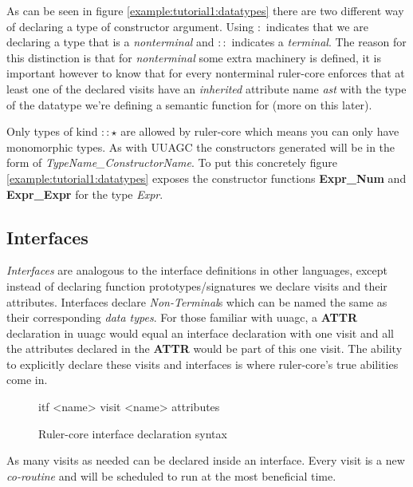 As can be seen in figure \ref{example:tutorial1:datatypes} there are two different way of declaring a type of constructor argument. Using $:$ indicates that we are declaring a type that is a \emph{nonterminal} and $::$ indicates a \emph{terminal}. The reason for this distinction is that for \emph{nonterminal} some extra machinery is defined, it is important however to know that for every nonterminal ruler-core enforces that at least one of the declared visits have an \emph{inherited} attribute name \emph{ast} with the type of the datatype we're defining a semantic function for (more on this later).

Only types of kind $:: \star$ are allowed by ruler-core which means you can only have monomorphic types. As with UUAGC the constructors generated will be in the form of \emph{TypeName\_ConstructorName}. To put this concretely figure \ref{example:tutorial1:datatypes} exposes the constructor functions \textbf{Expr\_Num} and \textbf{Expr\_Expr} for the type \emph{Expr}.

\subsection{Interfaces}
\emph{Interfaces} are analogous to the interface definitions in other languages, except instead of declaring function prototypes/signatures we declare visits and their attributes. Interfaces declare \emph{Non-Terminal}s which can be named the same as their corresponding \emph{data types}. For those familiar with uuagc, a \textbf{ATTR} declaration in uuagc would equal an interface declaration with one visit and all the attributes declared in the \textbf{ATTR} would be part of this one visit. The ability to explicitly declare these visits and interfaces is where ruler-core's true abilities come in.

\begin{figure}[h!]
\begin{code}
itf <name>
  {visit <name>
    {attributes}
  }
\end{code}
\caption{Ruler-core interface declaration syntax}
\label{itf:syntax}
\end{figure}

As many visits as needed can be declared inside an interface. Every visit is a new \emph{co-routine} and will be scheduled to run at the most beneficial time. %

